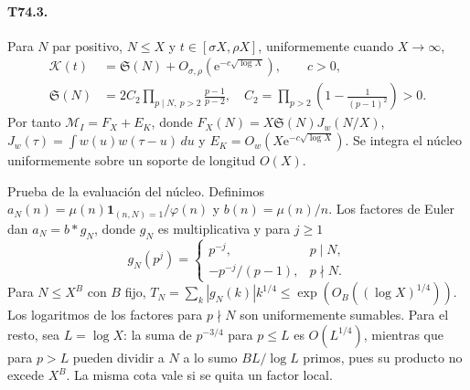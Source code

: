 \documentclass[11pt,a4paper]{article}
\newcommand{\B}[2]{#2}
\newcommand{\B}[2]{#1}
\newcommand{\e}{\mathrm e}
\newcommand{\one}{\mathbf 1}
\newcommand{\Sg}{\mathfrak S}
\begin{document}
\paragraph{T74.3.}
\B{For positive even $N\le X$ and $t\in[\sigma X,\rho X]$, uniformly as $X\to\infty$,}{Para $N$ par positivo, $N\le X$ y $t\in[\sigma X,\rho X]$, uniformemente cuando $X\to\infty$,}
\begin{align}
 \mathcal K(t)&=\Sg(N)+O_{\sigma,\rho}(\e^{-c\sqrt{\log X}}),\qquad c>0,\label{eq:kernel}\\
 \Sg(N)&=2C_2\!\prod_{p\mid N,\ p>2}\frac{p-1}{p-2},\quad
 C_2=\prod_{p>2}\left(1-\frac{1}{(p-1)^2}\right)>0.\nonumber
\end{align}
\B{Consequently $\mathcal M_I=F_X+E_K$, where $F_X(N)=X\Sg(N)J_w(N/X)$, $J_w(\tau)=\int w(u)w(\tau-u)\,du$ and $E_K=O_w(X\e^{-c\sqrt{\log X}})$. This integrates the kernel uniformly over support of length $O(X)$.}{Por tanto $\mathcal M_I=F_X+E_K$, donde $F_X(N)=X\Sg(N)J_w(N/X)$, $J_w(\tau)=\int w(u)w(\tau-u)\,du$ y $E_K=O_w(X\e^{-c\sqrt{\log X}})$. Se integra el núcleo uniformemente sobre un soporte de longitud $O(X)$.}

\B{Proof of the kernel evaluation. Define $a_N(n)=\mu(n)\one_{(n,N)=1}/\varphi(n)$ and $b(n)=\mu(n)/n$. Euler factors give $a_N=b*g_N$, where $g_N$ is multiplicative and for $j\ge1$}{Prueba de la evaluación del núcleo. Definimos $a_N(n)=\mu(n)\one_{(n,N)=1}/\varphi(n)$ y $b(n)=\mu(n)/n$. Los factores de Euler dan $a_N=b*g_N$, donde $g_N$ es multiplicativa y para $j\ge1$}
\[
 g_N(p^j)=\begin{cases}p^{-j},&p\mid N,\\-p^{-j}/(p-1),&p\nmid N.\end{cases}
\]
\B{For $N\le X^B$ with $B$ fixed, $T_N=\sum_k|g_N(k)|k^{1/4}\le\exp(O_B((\log X)^{1/4}))$. The factors for $p\nmid N$ are uniformly summable in their logarithms. For the others, set $L=\log X$: the sum of $p^{-3/4}$ at $p\le L$ is $O(L^{1/4})$, while at $p>L$ at most $BL/\log L$ primes can divide $N$, since their product is at most $X^B$. This bound also holds with any one local factor removed.}{Para $N\le X^B$ con $B$ fijo, $T_N=\sum_k|g_N(k)|k^{1/4}\le\exp(O_B((\log X)^{1/4}))$. Los logaritmos de los factores para $p\nmid N$ son uniformemente sumables. Para el resto, sea $L=\log X$: la suma de $p^{-3/4}$ para $p\le L$ es $O(L^{1/4})$, mientras que para $p>L$ pueden dividir a $N$ a lo sumo $BL/\log L$ primos, pues su producto no excede $X^B$. La misma cota vale si se quita un factor local.}
\end{document}
